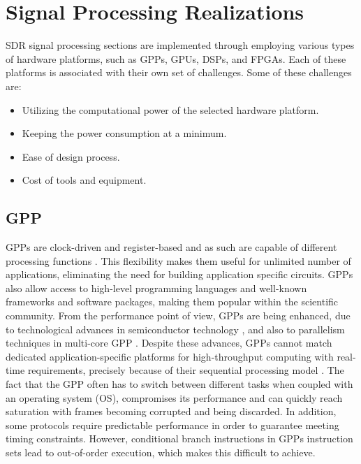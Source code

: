 \section{Signal Processing Realizations}
\label{sect:dsp_realizations}

SDR signal processing sections are implemented through employing various types of hardware platforms, such as GPPs, GPUs, DSPs, and FPGAs. Each of these platforms is associated with their own set of challenges. Some of these challenges are:
\begin{itemize}
  \item Utilizing the computational power of the selected hardware platform.
  \item Keeping the power consumption at a minimum.
  \item Ease of design process.
  \item Cost of tools and equipment.
\end{itemize}

\subsection{GPP}
GPPs are clock-driven and register-based and as such are capable of different processing functions \cite{microprocessors_and_microcontrollers}. This flexibility makes them useful for unlimited number of applications, eliminating the need for building application specific circuits. GPPs also allow access to high-level programming languages and well-known frameworks and software packages, making them popular within the scientific community. From the performance point of view, GPPs are being enhanced, due to technological advances in semiconductor technology \cite{lin2014a}, and also to parallelism techniques  in multi-core GPP \cite{ulversoy2010a}. Despite these advances, GPPs cannot match dedicated application-specific platforms for high-throughput computing with real-time requirements, precisely because of their sequential processing model \cite{kamal2003a}. The fact that the GPP often has to switch between different tasks when coupled with an operating system (OS), compromises its performance and can quickly reach saturation with frames becoming corrupted and being discarded. In addition, some protocols require predictable performance in order to guarantee meeting timing constraints. However, conditional branch instructions in GPPs instruction sets lead to out-of-order execution, which makes this difficult to achieve.

